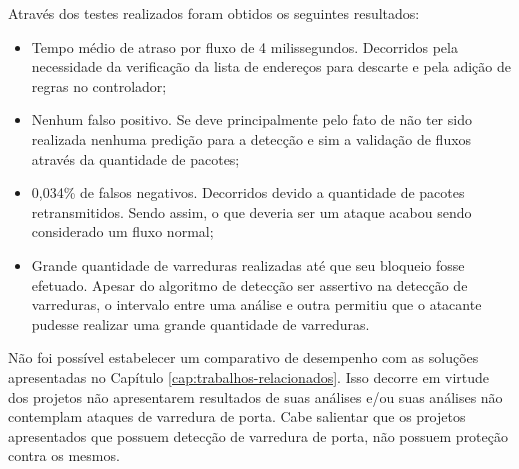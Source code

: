 Através dos testes realizados foram obtidos os seguintes resultados:
\begin{itemize}
    \item Tempo médio de atraso por fluxo de 4 milissegundos. Decorridos pela necessidade da verificação da lista de endereços para descarte e pela adição de regras no controlador;
    \item Nenhum falso positivo. Se deve principalmente pelo fato de não ter sido realizada nenhuma predição para a detecção e sim a validação de fluxos através da quantidade de pacotes;
    \item 0,034\% de falsos negativos. Decorridos devido a quantidade de pacotes retransmitidos. Sendo assim, o que deveria ser um ataque acabou sendo considerado um fluxo normal;
    \item Grande quantidade de varreduras realizadas até que seu bloqueio fosse efetuado. Apesar do algoritmo de detecção ser assertivo na detecção de varreduras, o intervalo entre uma análise e outra permitiu que o atacante pudesse realizar uma grande quantidade de varreduras.
\end{itemize}

\FloatBarrier

Não foi possível estabelecer um comparativo de desempenho com as soluções apresentadas no Capítulo \ref{cap:trabalhos-relacionados}. Isso decorre em virtude dos projetos não apresentarem resultados de suas análises e/ou suas análises não contemplam ataques de varredura de porta. Cabe salientar que os projetos apresentados que possuem detecção de varredura de porta, não possuem proteção contra os mesmos.